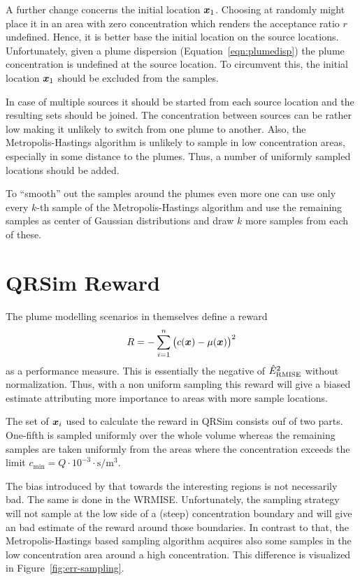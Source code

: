 A further change concerns the initial location $\bm{x}_1$. Choosing at randomly 
might place it in an area with zero concentration which renders the acceptance 
ratio $r$ undefined. Hence, it is better base the initial location on the source 
locations. Unfortunately, given a plume dispersion 
(Equation~\ref{eqn:plumedisp}) the plume concentration is undefined at the 
source location. To circumvent this, the initial location $\bm{x}_1$ should be 
excluded from the samples.

In case of multiple sources it should be started from each source location and 
the resulting sets should be joined. The concentration between sources can be 
rather low making it unlikely to switch from one plume to another. Also, the 
Metropolis-Hastings algorithm is unlikely to sample in low concentration areas, 
especially in some distance to the plumes. Thus, a number of uniformly sampled 
locations should be added.

To ``smooth'' out the samples around the plumes even more one can use only every 
$k$-th sample of the Metropolis-Hastings algorithm and use the remaining samples 
as center of Gaussian distributions and draw $k$ more samples from each of 
these.

\section{QRSim Reward}\label{sec:qrsim-reward}
The plume modelling scenarios in \textcite{denardi2013rn} themselves define 
a reward
\begin{equation}
    R = - \sum_{i = 1}^n \del{c(\vc x) - \mu(\vc x)}^2
\end{equation}
as a performance measure. This is essentially the negative of 
$\hat{E}_{\mathrm{RMISE}}^2$ without normalization. Thus, with a non uniform sampling 
this reward will give a biased estimate attributing more importance to areas 
with more sample locations.

The set of $\bm{x}_i$ used to calculate the reward in QRSim consists ouf of two 
parts. One-fifth is sampled uniformly over the whole volume whereas the 
remaining samples are taken uniformly from the areas where the concentration 
exceeds the limit $c_{\min} = Q \cdot 10^{-3} \cdot 
\si{\second\per\meter\cubed}$.

The bias introduced by that towards the interesting regions is not necessarily 
bad. The same is done in the WRMISE\@. Unfortunately, the sampling strategy will 
not sample at the low side of a (steep) concentration boundary and will give an 
bad estimate of the reward around those boundaries. In contrast to that, the 
Metropolis-Hastings based sampling algorithm acquires also some samples in the 
low concentration area around a high concentration.  This difference is 
visualized in Figure~\ref{fig:err-sampling}.

